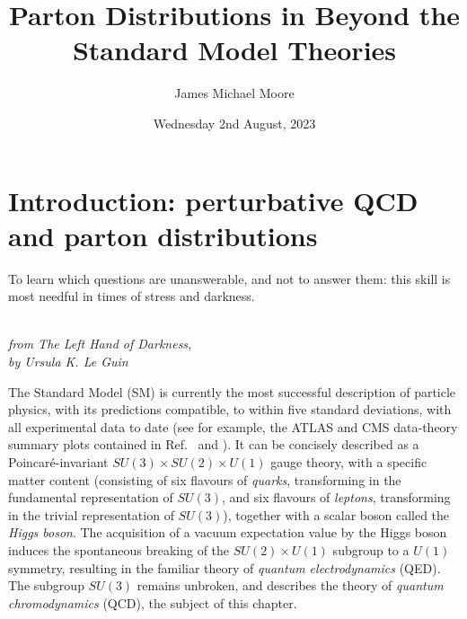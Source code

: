 \documentclass[withindex,glossary]{cam-thesis}
\title{Parton Distributions in Beyond the Standard Model Theories}
\author{James Michael Moore}
\date{Wednesday 2nd August, 2023}
\begin{document}
\frontmatter{}



\chapter{Introduction: perturbative QCD and parton distributions}
\label{chap:intro}

\epigraph{To learn which questions are unanswerable, and not to answer them: this skill is most needful in times of stress and darkness.}{\textit{\\ from The Left Hand of Darkness, \\ by Ursula K. Le Guin}}

The Standard Model (SM) is currently the most successful description of particle physics, with its predictions compatible, to within five standard deviations, with all experimental data to date (see for example, the ATLAS and CMS data-theory summary plots contained in Ref.~\cite{ATLAS:2022djm} and \cite{Ghosh:2019vqm}). It can be concisely described as a Poincar\'{e}-invariant $SU(3) \times SU(2) \times U(1)$ gauge theory, with a specific matter content (consisting of six flavours of \textit{quarks}, transforming in the fundamental representation of $SU(3)$, and six flavours of \textit{leptons}, transforming in the trivial representation of $SU(3)$), together with a scalar boson called the \textit{Higgs boson}. The acquisition of a vacuum expectation value by the Higgs boson induces the spontaneous breaking of the $SU(2) \times U(1)$ subgroup to a $U(1)$ symmetry, resulting in the familiar theory of \textit{quantum electrodynamics} (QED). The subgroup $SU(3)$ remains unbroken, and describes the theory of \textit{quantum chromodynamics} (QCD), the subject of this chapter.
\end{document}
